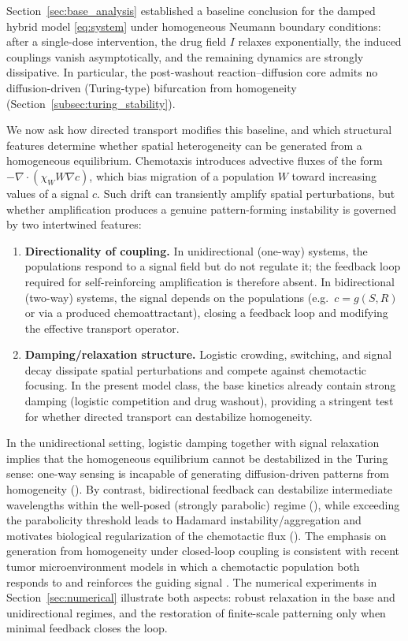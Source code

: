 \documentclass[pdflatex,sn-mathphys-ay]{sn-jnl}
\theoremstyle{thmstyleone}
\theoremstyle{definition}
\theoremstyle{remark}
\begin{document}
Section~\ref{sec:base_analysis} established a baseline conclusion for the damped hybrid model \eqref{eq:system} under homogeneous Neumann boundary conditions: after a single-dose intervention, the drug field $I$ relaxes exponentially, the induced couplings vanish asymptotically, and the remaining dynamics are strongly dissipative. 
In particular, the post-washout reaction--diffusion core admits no diffusion-driven (Turing-type) bifurcation from homogeneity (Section~\ref{subsec:turing_stability}).

We now ask how directed transport modifies this baseline, and which structural features determine whether spatial heterogeneity can be generated from a homogeneous equilibrium. 
Chemotaxis introduces advective fluxes of the form $-\nabla\cdot(\chi_W W\nabla c)$, which bias migration of a population $W$ toward increasing values of a signal $c$. 
Such drift can transiently amplify spatial perturbations, but whether amplification produces a genuine pattern-forming instability is governed by two intertwined features:

\begin{enumerate}[label=(\roman*)]
\item \textbf{Directionality of coupling.}
In unidirectional (one-way) systems, the populations respond to a signal field but do not regulate it; the feedback loop required for self-reinforcing amplification is therefore absent. 
In bidirectional (two-way) systems, the signal depends on the populations (e.g.\ $c=g(S,R)$ or via a produced chemoattractant), closing a feedback loop and modifying the effective transport operator.

\item \textbf{Damping/relaxation structure.}
Logistic crowding, switching, and signal decay dissipate spatial perturbations and compete against chemotactic focusing. 
In the present model class, the base kinetics already contain strong damping (logistic competition and drug washout), providing a stringent test for whether directed transport can destabilize homogeneity.
\end{enumerate}

In the unidirectional setting, logistic damping together with signal relaxation implies that the homogeneous equilibrium cannot be destabilized in the Turing sense: one-way sensing is incapable of generating diffusion-driven patterns from homogeneity (). 
By contrast, bidirectional feedback can destabilize intermediate wavelengths within the well-posed (strongly parabolic) regime (), while exceeding the parabolicity threshold leads to Hadamard instability/aggregation and motivates biological regularization of the chemotactic flux (). 
The emphasis on generation from homogeneity under closed-loop coupling is consistent with recent tumor microenvironment models in which a chemotactic population both responds to and reinforces the guiding signal \citep{liu2025bidirectional}. 
The numerical experiments in Section~\ref{sec:numerical} illustrate both aspects: robust relaxation in the base and unidirectional regimes, and the restoration of finite-scale patterning only when minimal feedback closes the loop.
\end{document}
